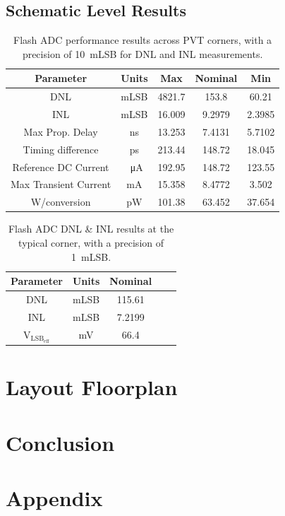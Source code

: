 \documentclass[11pt,letterpaper]{article}
\begin{document}
\subsection{Schematic Level Results}

\begin{table}[]
    \centering
    \begin{tabular}{ccccc}
    \toprule
        Parameter & Units & Max & Nominal & Min \\
    \midrule
        DNL & mLSB & 4821.7 & 153.8 & 60.21 \\
        INL & mLSB & 16.009 & 9.2979 & 2.3985 \\
        Max Prop. Delay & ns & 13.253 & 7.4131 & 5.7102 \\
        Timing difference & ps & 213.44 & 148.72 & 18.045 \\
        Reference DC Current & \qty{}{\uA} & 192.95 & 148.72 & 123.55 \\
        Max Transient Current & mA & 15.358 & 8.4772 & 3.502 \\
        W/conversion & pW & 101.38 & 63.452 & 37.654 \\
    \bottomrule
        
    \end{tabular}
    \caption{Flash ADC performance results across PVT corners, with a precision of \qty{10}{mLSB} for DNL and INL measurements.}\label{tab:corners_sch}
\end{table}

\begin{table}[]
    \centering
    \begin{tabular}{ccccc}
    \toprule
        Parameter & Units & Nominal \\
    \midrule
        DNL & mLSB & 115.61 \\
        INL & mLSB & 7.2199 \\
        \(\mathrm{V_{LSB_{eff}}}\) & mV & 66.4 \\
    \bottomrule
        
    \end{tabular}
    \caption{Flash ADC DNL \& INL results at the typical corner, with a precision of \qty{1}{mLSB}.}\label{tab:typ_sch}
\end{table}

\section{Layout Floorplan}

\section{Conclusion}

\newpage




\newpage
\section*{Appendix}
\end{document}
